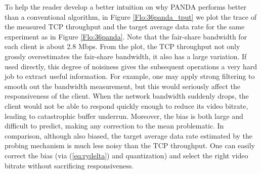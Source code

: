 \documentclass[conference]{IEEEtran}
\theoremstyle{plain}
\theoremstyle{definition}
\theoremstyle{plain}
\theoremstyle{plain}
\begin{document}
To help the reader develop a better intuition on why PANDA performs
better than a conventional algorithm, in Figure \ref{Flo:36panda_tput}
we plot the trace of the measured TCP throughput and the target average
data rate for the same experiment as in Figure \ref{Flo:36panda}.
Note that the fair-share bandwidth for each client is about 2.8 Mbps.
From the plot, the TCP throughput not only grossly overestimates the
fair-share bandwidth, it also has a large variation. If used directly,
this degree of noisiness gives the subsequent operations a very hard
job to extract useful information. For example, one may apply strong
filtering to smooth out the bandwidth measurement, but this would
seriously affect the responsiveness of the client. When the network
bandwidth suddenly drops, the client would not be able to respond
quickly enough to reduce its video bitrate, leading to catastrophic
buffer underrun. Moreover, the bias is both large and difficult to
predict, making any correction to the mean problematic. In comparison,
although also biased, the target average data rate estimated by the
probing mechanism is much less noisy than the TCP throughput. One
can easily correct the bias (via (\ref{eq:rydelta}) and quantization)
and select the right video bitrate without sacrificing responsiveness.
\end{document}

